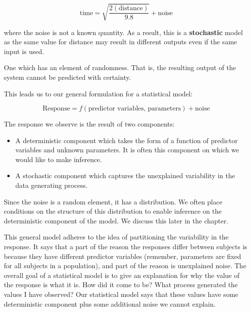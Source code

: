 \documentclass[]{book}
\providecommand{\tightlist}{%
  \setlength{\itemsep}{0pt}\setlength{\parskip}{0pt}}
\theoremstyle{plain}
\theoremstyle{mydefn}
\theoremstyle{myexmpl}
\theoremstyle{remark}
\let\BeginKnitrBlock\begin \let\EndKnitrBlock\end
\let\BeginKnitrBlock\begin \let\EndKnitrBlock\end
\begin{document}
\[\text{time} = \sqrt{\frac{2(\text{distance})}{9.8}} + \text{noise}\]

where the noise is not a known quantity. As a result, this is a
\textbf{stochastic} model as the same value for distance may result in
different outputs even if the same input is used.

\BeginKnitrBlock{definition}[Stochastic Process]
\protect\hypertarget{def:defn-stochastic-process}{}{\label{def:defn-stochastic-process}
{} }One which has an element of
randomness. That is, the resulting output of the system cannot be
predicted with certainty.
\EndKnitrBlock{definition}

This leads us to our general formulation for a statistical model:

\begin{equation}
  \text{Response} = f(\text{predictor variables, parameters}) + \text{noise}
  \label{eq:general-model}
\end{equation}

The response we observe is the result of two components:

\begin{itemize}
\tightlist
\item
  A deterministic component which takes the form of a function of
  predictor variables and unknown parameters. It is often this component
  on which we would like to make inference.
\item
  A stochastic component which captures the unexplained variability in
  the data generating process.
\end{itemize}

Since the noise is a random element, it has a distribution. We often
place conditions on the structure of this distribution to enable
inference on the deterministic component of the model. We discuss this
later in the chapter.

This general model adheres to the idea of partitioning the variability
in the response. It says that a part of the reason the responses differ
between subjects is because they have different predictor variables
(remember, parameters are fixed for all subjects in a population), and
part of the reason is unexplained noise. The overall goal of a
statistical model is to give an explanation for why the value of the
response is what it is. How did it come to be? What process generated
the values I have observed? Our statistical model says that these values
have some deterministic component plus some additional noise we cannot
explain.
\end{document}
